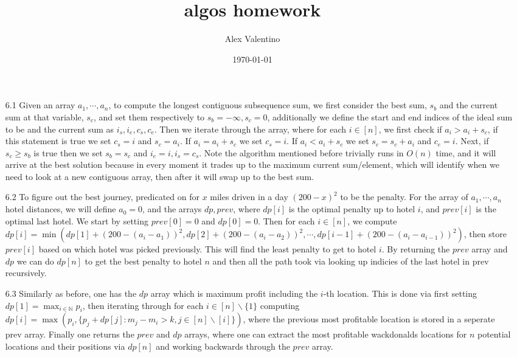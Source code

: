\documentclass[12pt, letterpaper]{article}
\date{\today}
\author{Alex Valentino}
\title{algos homework}
\newcommand{\N}{\mathbb{N}}
\begin{document}
\begin{enumerate}
	\item[6.1] Given an array $a_1,\cdots,a_n$, to compute the longest contiguous subsequence sum, we first 
	consider the best sum, $s_b$ and the current sum at that variable, $s_c$, and set them respectively to 
	$s_b = -\infty, s_c = 0$, additionally we define the start and end indices of the ideal sum to be and the current 
	sum as  
	$i_s, i_e, c_s, c_e$.  Then we iterate through the array, where for each $i \in [n]$, we first check 
	if $a_i > a_i + s_c$, if this statement is true we set $c_s = i$ and $s_c = a_i$.  If $a_i = a_i + s_c$ we set 
	$c_s = i$.  If $a_i < a_i + s_c$ we set $s_c = s_c + a_i$ and $c_e = i$.  Next, if $s_c \geq s_b$ is true then we set 
	$s_b = s_c$ and $i_e = i, i_s = c_s$.  Note the algorithm mentioned before trivially runs in $O(n)$ time, and 
	it will arrive at the best solution because in every moment it trades up to the maximum current sum/element, which 
	will identify when we need to look at a new contiguous array, then after it will swap up to the best sum.  
	\item[6.2] To figure out the best journey, predicated on for $x$ miles driven in a day 
	$(200-x)^2$ to be the penalty.  For the array of $a_1,\cdots,a_n$ hotel distances, we will define 
	$a_0 = 0$, and the arrays $dp, prev$, where $dp[i]$ is the optimal penalty up to hotel $i$, and 
	$prev[i]$ is the optimal last hotel.  We start by setting $prev[0] = 0$ and $dp[0] = 0$.  Then 
	for each $i \in [n]$, we compute $dp[i] = \min(dp[1] + (200 - (a_i - a_1))^2, dp[2] + (200 - (a_i - a_2))^2, 
	\cdots, dp[i-1] + (200 - (a_i - a_{i-1}))^2)$, then store $prev[i]$ based on which hotel was picked previously.  This will find the least penalty to get to hotel $i$.  By returning the $prev$ array and $dp$ we can do $dp[n]$ to 
	get the best penalty to hotel $n$ and then all the path took via looking up indicies of the last hotel 
	in prev recursively.  
	\item[6.3] Similarly as before, one has the $dp$ array which is maximum profit including the $i$-th location. 
	This is done via first setting $dp[1] = \max_{i \in \N} p_i$, then iterating through for each $i \in [n]\backslash \{1\}$ 
	computing $dp[i] = \max(p_i, \{p_j + dp[j]: m_j - m_i > k, j \in [n] \backslash [i]\})$, where the previous 
	most profitable location is stored in a seperate prev array.  Finally one returns the $prev$ and $dp$ arrays, 
	where one can extract the most profitable wackdonalds locations for $n$ potential locations and their positions via 
	$dp[n]$ and working backwards through the $prev$ array.  
\end{enumerate}
\end{document}
